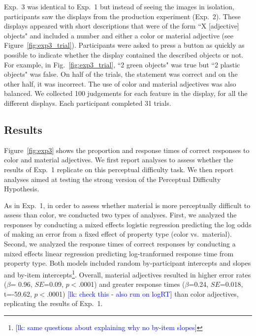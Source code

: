 \documentclass[12pt,letterpaper]{article}
\newcommand{\lk}[1]{\textcolor{Blue}{[lk: #1]}}
\begin{document}
Exp.~3 was identical to Exp.~1 but instead of seeing the images in isolation, participants saw the displays from the production experiment (Exp.~2). These displays appeared with short descriptions that were of the form ``X [adjective] objects" and included a number and either a color or material adjective (see Figure~\ref{fig:exp3_trial}). Participants were asked to press a button as quickly as possible to indicate whether the display contained the described objects or not. For example, in Fig.~\ref{fig:exp3_trial}, ``2 green objects" was true but ``2 plastic objects" was false. On half of the trials, the statement was correct and on the other half, it was incorrect. The use of color and material adjectives was also balanced. We collected 100 judgements for each feature in the display, for all the different displays. Each participant completed 31 trials.

\subsection{Results} 

Figure~\ref{fig:exp3} shows the proportion and response times of correct responses to color and material adjectives.  We first report analyses to assess whether the results of Exp.~1 replicate on this perceptual difficulty task. We then report analyses aimed at testing the strong version of the Perceptual Difficulty Hypothesis.

As in Exp.~1, in order to assess whether material is   more perceptually difficult to assess than color, we conducted two types of analyses. First, we analyzed the responses by conducting a mixed effects logistic regression predicting the log odds of making an error from a fixed effect of property type (color vs.~material). Second, we analyzed the response times of correct responses by conducting a mixed effects linear regression predicting log-tranformed response time from property type. Both models included random by-participant intercepts and slopes and by-item intercepts\footnote{\lk{same questions about explaining why no by-item slopes}}. Overall, material adjectives resulted in higher error rates ($\beta$= 0.96, $SE$=0.09, $p$$<$.0001) and greater response times ($\beta$=0.24, $SE$=0.018, t=-59.62, $p$$<$.0001) \lk{check this - also run on logRT} than color adjectives, replicating the results of Exp.~1. 
\end{document}

